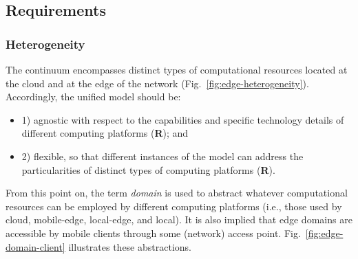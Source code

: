 \subsection{Requirements}\label{sec:requirements}


\subsubsection{Heterogeneity}

The continuum encompasses distinct types of computational resources located at the cloud and at the edge of the network (Fig.~\ref{fig:edge-heterogeneity}). Accordingly, the unified model should be:

\begin{itemize}

\item 1) agnostic with respect to the capabilities and specific technology details of different computing platforms (\textbf{R}); and

\item 2) flexible, so that different instances of the model can address the particularities of distinct types of computing platforms (\textbf{R}).

\end{itemize}

From this point on, the term \textit{domain} is used to abstract whatever computational resources can be employed by different computing platforms (i.e., those used by cloud, mobile-edge, local-edge, and local). It is also implied that edge domains are accessible by mobile clients through some (network) access point. Fig.~\ref{fig:edge-domain-client} illustrates these abstractions. 

